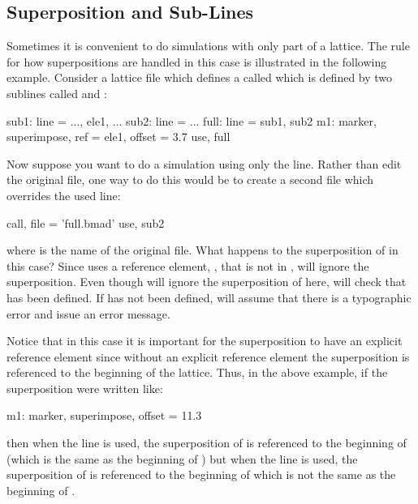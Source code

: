 \subsection{Superposition and Sub-Lines}
\label{s:super.sub.line}

Sometimes it is convenient to do simulations with only part of a lattice. The rule for how
superpositions are handled in this case is illustrated in the following example. Consider
a lattice file which defines a  called  which is defined by two sublines called
 and :
\begin{example}
  sub1: line = {..., ele1, ...}
  sub2: line = {...}
  full: line = {sub1, sub2}
  m1: marker, superimpose, ref = ele1, offset = 3.7
  use, full
\end{example}
Now suppose you want to do a simulation using only the  line. Rather than edit the
original file, one way to do this would be to create a second file which
overrides the used line:
\begin{example}
  call, file = 'full.bmad'
  use, sub2
\end{example}
where  is the name of the original file. What happens to the superposition
of  in this case? Since  uses a reference element, , that is not in
, \bmad will ignore the superposition. Even though \bmad will ignore the superposition
of  here, \bmad will check that  has been defined. If  has not been
defined, \bmad will assume that there is a typographic error and issue an error message. 

Notice that in this case it is important for the superposition to have an explicit
reference element since without an explicit reference element the superposition is
referenced to the beginning of the lattice. Thus, in the above example, if the
superposition were written like:
\begin{example}
  m1: marker, superimpose, offset = 11.3
\end{example}
then when the  line is used, the superposition of  is referenced to the
beginning of  (which is the same as the beginning of ) but when the
 line is used, the superposition of  is referenced to the beginning
of  which is not the same as the beginning of .

